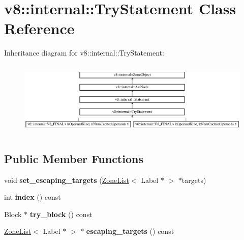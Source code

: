 \hypertarget{classv8_1_1internal_1_1_try_statement}{}\section{v8\+:\+:internal\+:\+:Try\+Statement Class Reference}
\label{classv8_1_1internal_1_1_try_statement}
Inheritance diagram for v8\+:\+:internal\+:\+:Try\+Statement\+:\begin{figure}[H]
\begin{center}
\leavevmode
\includegraphics[height=3.571428cm]{classv8_1_1internal_1_1_try_statement}
\end{center}
\end{figure}
\subsection*{Public Member Functions}
\begin{DoxyCompactItemize}
\item 
\hypertarget{classv8_1_1internal_1_1_try_statement_a48f6470a1e695223ba27693a5a7e8831}{}void {\bfseries set\+\_\+escaping\+\_\+targets} (\hyperlink{classv8_1_1internal_1_1_zone_list}{Zone\+List}$<$ Label $\ast$ $>$ $\ast$targets)\label{classv8_1_1internal_1_1_try_statement_a48f6470a1e695223ba27693a5a7e8831}

\item 
\hypertarget{classv8_1_1internal_1_1_try_statement_a08ba055b287f8e5d39e7a2f9d0c4930c}{}int {\bfseries index} () const \label{classv8_1_1internal_1_1_try_statement_a08ba055b287f8e5d39e7a2f9d0c4930c}

\item 
\hypertarget{classv8_1_1internal_1_1_try_statement_aeed2f3df112e0d9a8c7638dc3d656d23}{}Block $\ast$ {\bfseries try\+\_\+block} () const \label{classv8_1_1internal_1_1_try_statement_aeed2f3df112e0d9a8c7638dc3d656d23}

\item 
\hypertarget{classv8_1_1internal_1_1_try_statement_a405ebd4a17c6aedf82021b7870ae7b65}{}\hyperlink{classv8_1_1internal_1_1_zone_list}{Zone\+List}$<$ Label $\ast$ $>$ $\ast$ {\bfseries escaping\+\_\+targets} () const \label{classv8_1_1internal_1_1_try_statement_a405ebd4a17c6aedf82021b7870ae7b65}

\end{DoxyCompactItemize}
